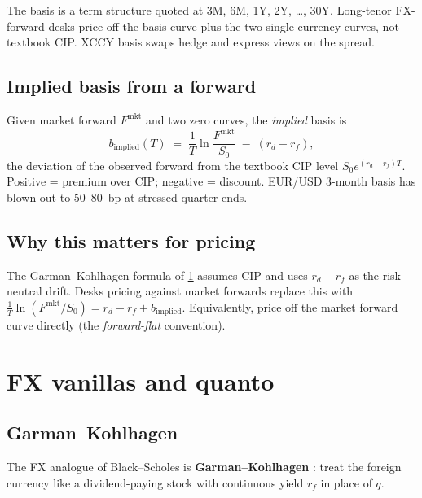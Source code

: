 The basis is a term structure quoted at 3M, 6M, 1Y, 2Y, \ldots, 30Y.
Long-tenor FX-forward desks price off the basis curve plus the two
single-currency curves, not textbook CIP.  XCCY basis swaps hedge
and express views on the spread.

\subsection{Implied basis from a forward}
\label{subsec:implied_basis}

Given market forward $F^{\mathrm{mkt}}$ and two zero curves, the
\emph{implied} basis is
\begin{equation}
  b_{\mathrm{implied}}(T) \;=\;
  \frac{1}{T}\ln\frac{F^{\mathrm{mkt}}}{S_0}
  \;-\; (r_d - r_f),
  \label{eq:implied_basis}
\end{equation}
the deviation of the observed forward from the textbook CIP level
$S_0 e^{(r_d-r_f)T}$.  Positive = premium over CIP; negative =
discount.  EUR/USD 3-month basis has blown out to 50--80~bp at
stressed quarter-ends.

\subsection{Why this matters for pricing}

The Garman--Kohlhagen formula of \cref{sec:fx_vanillas} assumes CIP
and uses $r_d - r_f$ as the risk-neutral drift.  Desks pricing
against market forwards replace this with
$\tfrac{1}{T}\ln(F^{\mathrm{mkt}}/S_0) = r_d - r_f +
b_{\mathrm{implied}}$.  Equivalently, price off the market forward
curve directly (the \emph{forward-flat} convention).


\section{FX vanillas and quanto}
\label{sec:fx_vanillas}

\subsection{Garman--Kohlhagen}

The FX analogue of Black--Scholes is \textbf{Garman--Kohlhagen}
\citep{garman1983foreign}: treat the foreign currency like a
dividend-paying stock with continuous yield $r_f$ in place of $q$.

